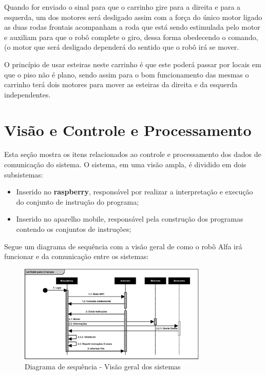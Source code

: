 Quando for enviado o sinal para que o carrinho gire para a direita e para a esquerda, um dos motores será desligado assim com a força do único motor ligado as duas rodas frontais acompanham a roda que está sendo estimulada pelo motor e auxiliam para que o robô complete o giro, dessa forma obedecendo o comando, (o motor que será desligado dependerá do sentido que o robô irá se mover.
 
O princípio de usar esteiras neste carrinho é que este poderá passar por locais em que o piso não é plano, sendo assim para o bom funcionamento das mesmas o carrinho terá dois motores  para mover as esteiras da direita e da esquerda independentes. 

\section{Visão e Controle e Processamento}

Esta seção mostra os itens relacionados ao controle e processamento dos dados de comunicação do sistema. O sistema, em uma visão ampla,
é dividido em dois subsistemas:

\begin{itemize}
\item Inserido no \textbf{raspberry}, responsável por realizar a interpretação e execução do conjunto de instrução do programa;
\item Inserido no aparelho mobile, responsável pela construção dos programas contendo os conjuntos de instruções;
\end{itemize}

Segue um diagrama de sequência com a visão geral de como o robô Alfa irá funcionar e da comunicação entre os sistemas:

\begin{figure}[H]
    \centering
    \includegraphics[width=0.8\textwidth]{figuras/diagrama_de_sequencia.eps}
    \caption{Diagrama de sequência - Visão geral dos sistemas}
    \label{fig:sequencia}
\end{figure}

